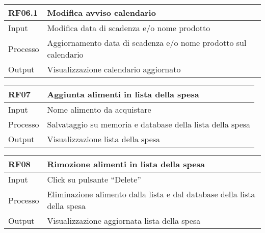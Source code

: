 \begin{table}[H]
    \begin{flushleft}
      \begin{tabular}{l|l}
        \toprule
        \textbf{RF06.1} & \textbf{Modifica avviso calendario}\\
        \midrule
        Input & Modifica data di scadenza e/o nome prodotto\\
        Processo & Aggiornamento data di scadenza e/o nome prodotto sul calendario\\
        Output & Visualizzazione calendario aggiornato\\
        \bottomrule
      \end{tabular}
    \end{flushleft}
\end{table}

\begin{table}[H]
    \begin{flushleft}
      \begin{tabular}{l|l}
        \toprule
        \textbf{RF07} & \textbf{Aggiunta alimenti in lista della spesa}\\
        \midrule
        Input & Nome alimento da acquistare\\
        Processo & Salvataggio su memoria e database della lista della spesa\\
        Output & Visualizzazione lista della spesa\\
        \bottomrule
      \end{tabular}
    \end{flushleft}
\end{table}

\begin{table}[H]
    \begin{flushleft}
      \begin{tabular}{l|l}
        \toprule
        \textbf{RF08} & \textbf{Rimozione alimenti in lista della spesa}\\
        \midrule
        Input & Click su pulsante “Delete”\\
        Processo & Eliminazione alimento dalla lista e dal database della lista della spesa\\
        Output & Visualizzazione aggiornata lista della spesa\\
        \bottomrule
      \end{tabular}
    \end{flushleft}
\end{table}


